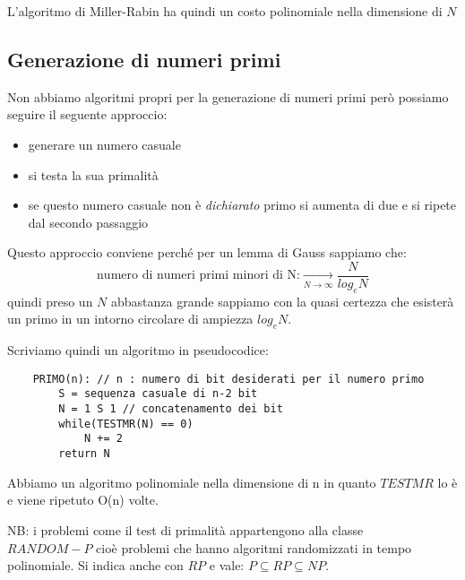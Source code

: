 L'algoritmo di Miller-Rabin ha quindi un costo polinomiale nella dimensione di $N$


\subsection{Generazione di numeri primi}
Non abbiamo algoritmi propri per la generazione di numeri primi però possiamo seguire il seguente approccio:
\begin{itemize}
    \item generare un numero casuale
    \item si testa la sua primalità
    \item se questo numero casuale non è \emph{dichiarato} primo si aumenta di due e si ripete dal secondo passaggio
\end{itemize}

Questo approccio conviene perché per un lemma di Gauss sappiamo che:
$$ \text{numero di numeri primi minori di N:} \xrightarrow[N \to \infty]{} \frac{N}{log_eN} $$
quindi preso un $N$ abbastanza grande sappiamo con la quasi certezza che esisterà un primo in un intorno circolare di ampiezza $log_eN$.

Scriviamo quindi un algoritmo in pseudocodice:
\begin{verbatim}
    PRIMO(n): // n : numero di bit desiderati per il numero primo
        S = sequenza casuale di n-2 bit
        N = 1 S 1 // concatenamento dei bit
        while(TESTMR(N) == 0)
            N += 2
        return N
\end{verbatim}
Abbiamo un algoritmo polinomiale nella dimensione di n in quanto $TESTMR$ lo è e viene ripetuto O(n) volte.

NB: i problemi come il test di primalità appartengono alla classe \\ $RANDOM-P$ cioè problemi che hanno algoritmi randomizzati in tempo polinomiale.
Si indica anche con $RP$ e vale: $P \subseteq RP \subseteq NP $.